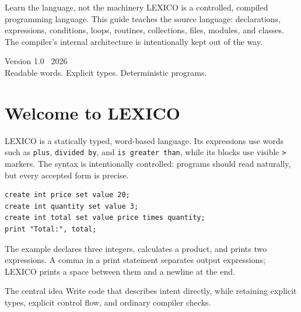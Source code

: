 \documentclass[10.5pt,a4paper]{article}
\begin{document}
\begin{titlepage}\pagecolor{paper}
\vspace*{10cm}
\begin{tipbox}{Learn the language, not the machinery}
LEXICO is a controlled, compiled programming language. This guide teaches the source language: declarations, expressions, conditions, loops, routines, collections, files, modules, and classes. The compiler's internal architecture is intentionally kept out of the way.
\end{tipbox}
\vfill\sffamily\color{navy}\large Version 1.0 \textbullet\ 2026\\[2mm]\color{ink}\normalsize Readable words. Explicit types. Deterministic programs.
\end{titlepage}\nopagecolor
\tableofcontents\newpage
\section{Welcome to LEXICO}
LEXICO is a statically typed, word-based language. Its expressions use words such as \texttt{plus}, \texttt{divided by}, and \texttt{is greater than}, while its blocks use visible \texttt{>} markers. The syntax is intentionally controlled: programs should read naturally, but every accepted form is precise.
\begin{lstlisting}
create int price set value 20;
create int quantity set value 3;
create int total set value price times quantity;
print "Total:", total;
\end{lstlisting}
The example declares three integers, calculates a product, and prints two expressions. A comma in a print statement separates output expressions; LEXICO prints a space between them and a newline at the end.
\begin{tipbox}{The central idea}
Write code that describes intent directly, while retaining explicit types, explicit control flow, and ordinary compiler checks.
\end{tipbox}
\end{document}
